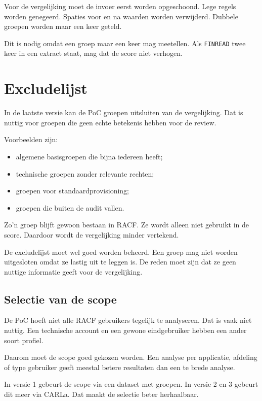 Voor de vergelijking moet de invoer eerst worden opgeschoond. Lege regels worden genegeerd. Spaties voor en na waarden worden verwijderd. Dubbele groepen worden maar een keer geteld.

Dit is nodig omdat een groep maar een keer mag meetellen. Als \texttt{FINREAD} twee keer in een extract staat, mag dat de score niet verhogen.

\section{Excludelijst}

In de laatste versie kan de PoC groepen uitsluiten van de vergelijking. Dat is nuttig voor groepen die geen echte betekenis hebben voor de review.

Voorbeelden zijn:

\begin{itemize}
	\item algemene basisgroepen die bijna iedereen heeft;
	\item technische groepen zonder relevante rechten;
	\item groepen voor standaardprovisioning;
	\item groepen die buiten de audit vallen.
\end{itemize}

Zo'n groep blijft gewoon bestaan in RACF. Ze wordt alleen niet gebruikt in de score. Daardoor wordt de vergelijking minder vertekend.

De excludelijst moet wel goed worden beheerd. Een groep mag niet worden uitgesloten omdat ze lastig uit te leggen is. De reden moet zijn dat ze geen nuttige informatie geeft voor de vergelijking.

\subsection*{Selectie van de scope}

De PoC hoeft niet alle RACF gebruikers tegelijk te analyseren. Dat is vaak niet nuttig. Een technische account en een gewone eindgebruiker hebben een ander soort profiel.

Daarom moet de scope goed gekozen worden. Een analyse per applicatie, afdeling of type gebruiker geeft meestal betere resultaten dan een te brede analyse.

In versie 1 gebeurt de scope via een dataset met groepen. In versie 2 en 3 gebeurt dit meer via CARLa. Dat maakt de selectie beter herhaalbaar.

